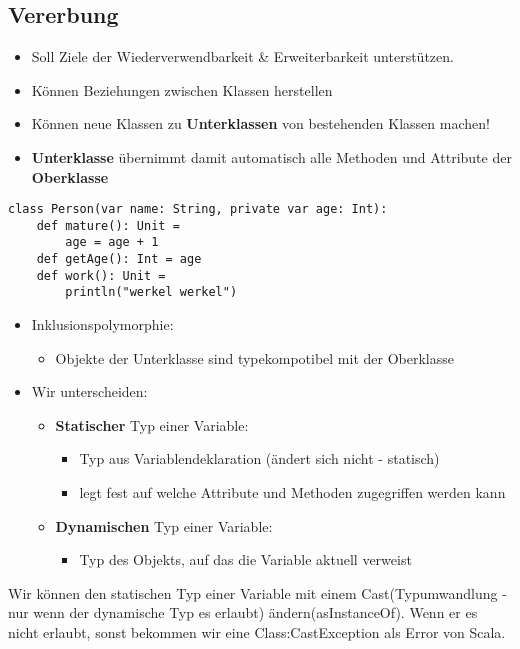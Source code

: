 \documentclass{article}
\begin{document}
\subsection{Vererbung}
\begin{itemize}
\item Soll Ziele der Wiederverwendbarkeit \& Erweiterbarkeit unterstützen.
\item Können Beziehungen zwischen Klassen herstellen
\item Können neue Klassen zu \textbf{Unterklassen} von bestehenden Klassen machen!
\item \textbf{Unterklasse} übernimmt damit automatisch alle Methoden und Attribute der \textbf{Oberklasse}
\end{itemize}
\begin{verbatim}
class Person(var name: String, private var age: Int):
	def mature(): Unit = 
		age = age + 1
	def getAge(): Int = age
	def work(): Unit = 
		println("werkel werkel")
\end{verbatim}

\begin{itemize}
	\item Inklusionspolymorphie:
	\begin{itemize}
		\item Objekte der Unterklasse sind typekompotibel mit der Oberklasse
	\end{itemize}
	\item Wir unterscheiden:
\begin{itemize}
	\item \textbf{Statischer} Typ einer Variable:
	\begin{itemize}
		\item Typ aus Variablendeklaration (ändert sich nicht - statisch)
		\item legt fest auf welche Attribute und Methoden zugegriffen werden kann
	\end{itemize}
	\item \textbf{Dynamischen} Typ einer Variable:
	\begin{itemize}
		\item Typ des Objekts, auf das die Variable aktuell verweist
	\end{itemize}
\end{itemize}
\end{itemize}
Wir können den statischen Typ einer Variable mit einem Cast(Typumwandlung - nur wenn der dynamische Typ es erlaubt) ändern(asInstanceOf). Wenn er es nicht erlaubt, sonst bekommen wir eine Class:CastException als Error von Scala.
\end{document}
